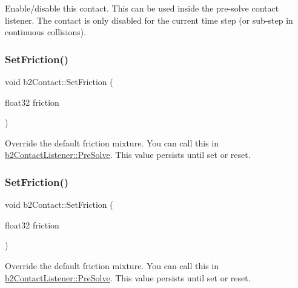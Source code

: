 Enable/disable this contact. This can be used inside the pre-\/solve contact listener. The contact is only disabled for the current time step (or sub-\/step in continuous collisions). \mbox{\label{classb2Contact_a5e8fbb6bb2966ac84272bb0ea9d2e4c7}} 
\subsubsection{\texorpdfstring{Set\+Friction()}{SetFriction()}\hspace{0.1cm}{\footnotesize\ttfamily [1/2]}}
{\footnotesize\ttfamily void b2\+Contact\+::\+Set\+Friction (\begin{DoxyParamCaption}\item[{float32}]{friction }\end{DoxyParamCaption})\hspace{0.3cm}{\ttfamily [inline]}}

Override the default friction mixture. You can call this in \hyperlink{classb2ContactListener_a416f85eb45a1099053402b15a19a7de0}{b2\+Contact\+Listener\+::\+Pre\+Solve}. This value persists until set or reset. \mbox{\label{classb2Contact_a5e8fbb6bb2966ac84272bb0ea9d2e4c7}} 
\subsubsection{\texorpdfstring{Set\+Friction()}{SetFriction()}\hspace{0.1cm}{\footnotesize\ttfamily [2/2]}}
{\footnotesize\ttfamily void b2\+Contact\+::\+Set\+Friction (\begin{DoxyParamCaption}\item[{float32}]{friction }\end{DoxyParamCaption})}

Override the default friction mixture. You can call this in \hyperlink{classb2ContactListener_a416f85eb45a1099053402b15a19a7de0}{b2\+Contact\+Listener\+::\+Pre\+Solve}. This value persists until set or reset. \mbox{\label{classb2Contact_a24ca342c2bb766c53ef5ad04f5268fc1}} 
